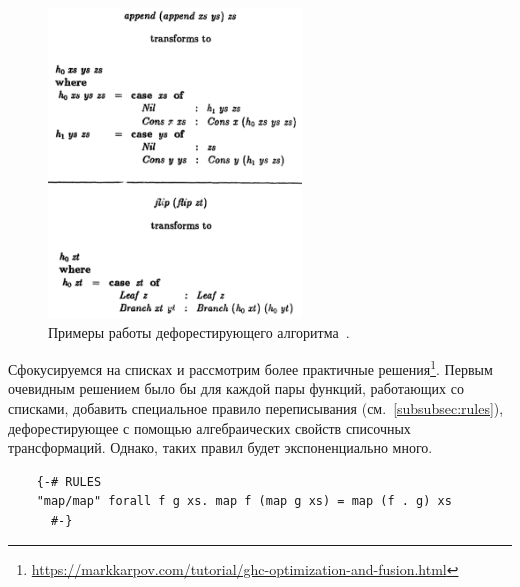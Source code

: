 \begin{figure}
    \centering
    \includegraphics[width=0.6\textwidth]{figs/deforestation-examples}
    \caption{Примеры работы дефорестирующего алгоритма~\cite{wadler1988deforestation}.}
    \label{fig:deforestation-examples}
\end{figure}

Сфокусируемся на списках и рассмотрим более практичные решения\footnote{\url{https://markkarpov.com/tutorial/ghc-optimization-and-fusion.html}}.
Первым очевидным решением было бы для каждой пары функций, работающих со списками, добавить специальное правило переписывания (см.~\ref{subsubsec:rules}), дефорестирующее с помощью алгебраических свойств списочных трансформаций.
Однако, таких правил будет экспоненциально много.
\begin{verbatim}
    {-# RULES
    "map/map" forall f g xs. map f (map g xs) = map (f . g) xs
      #-}
\end{verbatim}

